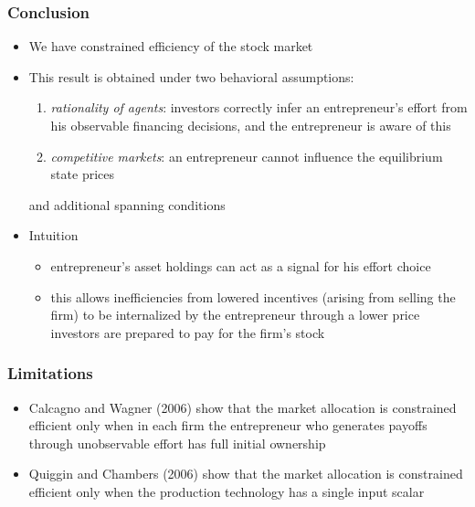 \documentclass[blue]{beamer}
\theoremstyle{definition}
\theoremstyle{example}
\begin{document}

\begin{frame}\frametitle{Conclusion}

\begin{itemize}
\item We have constrained efficiency of the stock market
\item This result is obtained under two behavioral assumptions:
    \begin{enumerate}
    \item \emph{rationality of agents}: investors correctly infer an entrepreneur's effort from his observable financing decisions, and the entrepreneur is aware of this
    \item \emph{competitive markets}: an entrepreneur cannot influence the equilibrium state prices
    \end{enumerate}
and additional spanning conditions
\item Intuition
    \begin{itemize}
    \item entrepreneur's asset holdings can act as a signal for his effort choice
    \item this allows inefficiencies from lowered incentives (arising from selling the firm) to be internalized by the entrepreneur through a lower price investors are prepared to pay for the firm's stock
    \end{itemize}
\end{itemize}

\end{frame}


\begin{frame}\frametitle{Limitations}

\begin{itemize}
\item Calcagno and Wagner (2006) show that the market allocation is constrained efficient only when in each firm the entrepreneur who generates payoffs through unobservable effort has full initial ownership
\item Quiggin and Chambers (2006) show that the market allocation is constrained efficient only when the production technology has a single input scalar
\end{itemize}

\end{frame}

\end{document}
